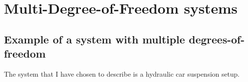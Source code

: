 \documentclass[11pt]{article}
\numberwithin{equation}{section}
\begin{document}
\section{Multi-Degree-of-Freedom systems}
\subsection{Example of a system with multiple degrees-of-freedom}
The system that I have chosen to describe is a hydraulic car suspension setup.


\end{document}
